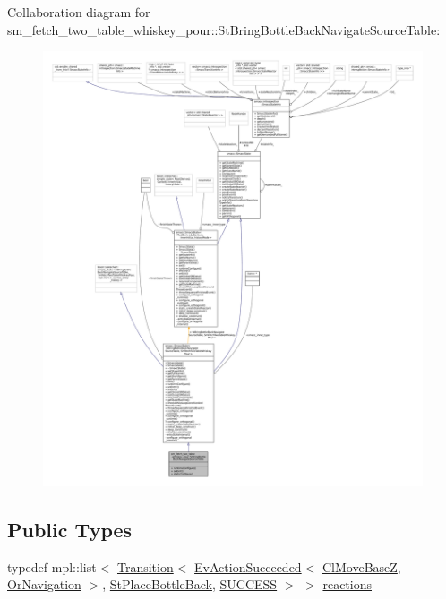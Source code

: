 Collaboration diagram for sm\+\_\+fetch\+\_\+two\+\_\+table\+\_\+whiskey\+\_\+pour\+:\+:St\+Bring\+Bottle\+Back\+Navigate\+Source\+Table\+:
\nopagebreak
\begin{figure}[H]
\begin{center}
\leavevmode
\includegraphics[width=350pt]{structsm__fetch__two__table__whiskey__pour_1_1StBringBottleBackNavigateSourceTable__coll__graph}
\end{center}
\end{figure}
\subsection*{Public Types}
\begin{DoxyCompactItemize}
\item 
typedef mpl\+::list$<$ \hyperlink{classsmacc_1_1Transition}{Transition}$<$ \hyperlink{structsmacc_1_1default__events_1_1EvActionSucceeded}{Ev\+Action\+Succeeded}$<$ \hyperlink{classcl__move__base__z_1_1ClMoveBaseZ}{Cl\+Move\+BaseZ}, \hyperlink{classsm__fetch__two__table__whiskey__pour_1_1OrNavigation}{Or\+Navigation} $>$, \hyperlink{structsm__fetch__two__table__whiskey__pour_1_1StPlaceBottleBack}{St\+Place\+Bottle\+Back}, \hyperlink{structsmacc_1_1default__transition__tags_1_1SUCCESS}{S\+U\+C\+C\+E\+SS} $>$ $>$ \hyperlink{structsm__fetch__two__table__whiskey__pour_1_1StBringBottleBackNavigateSourceTable_a56c7604d1b51ccec20e24b34bb92e4be}{reactions}
\end{DoxyCompactItemize}
